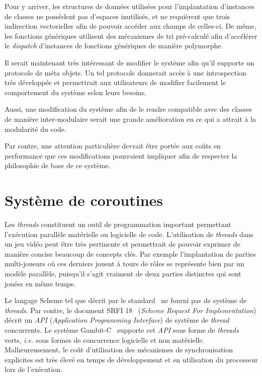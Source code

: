 \documentclass[12pt,oneside,letterpaper,francais]{book}
\newcommand{\ie}{{\textit{i.e. }}}
\begin{document}
Pour y arriver, les structures de données utilisées pour
l'implantation d'instances de classes ne possèdent pas d'espaces
inutilisés, et ne requièrent que trois indirection vectorielles afin
de pouvoir accéder aux champs de celles-ci. De même, les fonctions
génériques utilisent des mécanismes de tri pré-calculé afin
d'accélérer le \textit{dispatch} d'instances de fonctions génériques
de manière polymorphe. 

Il serait maintenant très intéressant de modifier le système afin
qu'il supporte un protocole de méta objets. Un tel protocole donnerait
accès à une introspection très développée et permettrait aux
utilisateurs de modifier facilement le comportement du système selon
leurs besoins. 

Aussi, une modification du système afin de le rendre compatible avec
des classes de manière inter-modulaire serait une grande amélioration
en ce qui a attrait à la modularité du code.

Par contre, une attention particulière devrait être portée aux coûts
en performance que ces modifications pourraient impliquer afin de
respecter la philosophie de base de ce système.


\chapter{Système de coroutines}
\label{Chap:corout}

Les \textit{threads} constituent un outil de programmation important
permettant l'exécution parallèle matérielle ou logicielle de
code. L'utilisation de \textit{threads} dans un jeu vidéo peut être
très pertinente et permettrait de pouvoir exprimer de manière concise
beaucoup de concepts clés. Par exemple l'implantation de parties
multi-joueurs où ces derniers jouent à tours de rôles se représente
bien par un modèle parallèle, puisqu'il s'agit vraiment de deux
parties distinctes qui sont jouées en même temps. 

Le langage Scheme tel que décrit par le standard~\cite{R5RS} ne fourni
pas de système de \textit{threads}. Par contre, le document SRFI
18~\cite{SRFI18} (\textit{Scheme Request For Implementation}) décrit
un \textit{API} (\textit{Application Programming Interface}) de
système de \textit{thread} concurrents. Le système
Gambit-C~\cite{Gambit4} supporte cet \textit{API} sous forme de
\textit{threads} verts, \ie  sous formes de concurrence logicielle et
non matérielle. Malheureusement, le coût d'utilisation des mécanismes
de synchronisation explicites est très élevé en temps de développement
et en utilisation du processeur lors de l'exécution.
\end{document}
